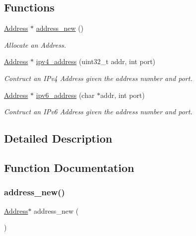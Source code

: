 \subsection*{Functions}
\begin{DoxyCompactItemize}
\item 
\hyperlink{group__address_ga80f2dcdb3778441e85ac8c9dbb6f324a}{Address} $\ast$ \hyperlink{group__address_ga85a8bd0dd6b9139d97f514010a98260d}{address\+\_\+new} ()
\begin{DoxyCompactList}\small\item\em Allocate an Address. \end{DoxyCompactList}\item 
\hyperlink{group__address_ga80f2dcdb3778441e85ac8c9dbb6f324a}{Address} $\ast$ \hyperlink{group__address_gadcf5fd6cadba30e8c63131dee535eda9}{ipv4\+\_\+address} (uint32\+\_\+t addr, int port)
\begin{DoxyCompactList}\small\item\em Contruct an I\+Pv4 Address given the address number and port. \end{DoxyCompactList}\item 
\hyperlink{group__address_ga80f2dcdb3778441e85ac8c9dbb6f324a}{Address} $\ast$ \hyperlink{group__address_ga02db9250da5222ffccdd99c6f2b2d410}{ipv6\+\_\+address} (char $\ast$addr, int port)
\begin{DoxyCompactList}\small\item\em Contruct an I\+Pv6 Address given the address number and port. \end{DoxyCompactList}\end{DoxyCompactItemize}


\subsection{Detailed Description}


\subsection{Function Documentation}
\mbox{\label{group__address_ga85a8bd0dd6b9139d97f514010a98260d}} 
\subsubsection{\texorpdfstring{address\+\_\+new()}{address\_new()}}
{\footnotesize\ttfamily \hyperlink{group__address_ga80f2dcdb3778441e85ac8c9dbb6f324a}{Address}$\ast$ address\+\_\+new (\begin{DoxyParamCaption}{ }\end{DoxyParamCaption})}



